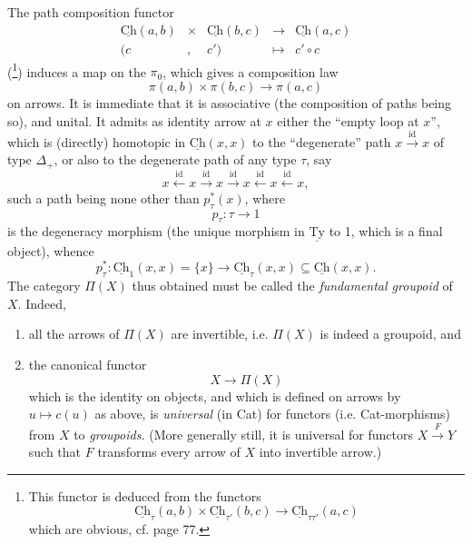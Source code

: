 \documentclass[11pt]{article}
\newcommand{\printedpage}[1]{\marginpar{\footnotesize p.~#1}}
\newcommand{\msp}[1]{\marginpar{\footnotesize [#1]}}
\newcommand{\Ch}{\underline{\mathrm{Ch}}}
\newcommand{\Ty}{\underline{\mathrm{Ty}}}
\begin{document}
\printedpage{41}
The path composition functor
\[
\begin{array}{ccccc}
\Ch(a,b) & \times & \Ch(b,c) & \longrightarrow & \Ch(a,c)\\
(c & , & c') & \longmapsto & c' \circ c
\end{array}
\]
 (\footnote[17]{This functor is deduced from the functors
\[
\Ch_\tau(a,b) \times \Ch_{\tau'}(b,c) \longrightarrow \Ch_{\tau\tau'}(a,c)
\]
which are obvious, cf. page 77.}) induces a map on the $\pi_0$, which gives a composition law
\[
\pi(a,b) \times \pi(b,c) \longrightarrow \pi(a,c)
\]
on arrows. It is immediate that it is associative (the composition of paths being so), and unital. It admits as identity arrow at $x$ either the ``empty loop at $x$'', which is (directly) homotopic in $\Ch(x,x)$ to the ``degenerate'' path $x \xrightarrow{\mathrm{id}} x$
\msp{page 62}
of type $\Delta_+$, or also to the degenerate path of any type $\tau$, say
\[
x \xleftarrow{\mathrm{id}} x \xrightarrow{\mathrm{id}} x \xrightarrow{\mathrm{id}} x \xleftarrow{\mathrm{id}} x \xleftarrow{\mathrm{id}} x,
\]
such a path being none other than $p_\tau^*(x)$, where
\[
p_\tau : \tau \longrightarrow 1
\]
is the degeneracy morphism (the unique morphism in $\Ty$ to 1, which is a final object), whence
\[
p_\tau^* : \Ch_1(x,x) = \{x\} \longrightarrow \Ch_\tau(x,x) \subseteq \Ch(x,x).
\]
The category $\Pi(X)$ thus obtained must be called the \textit{fundamental groupoid} of $X$. Indeed, %

\begin{enumerate}[label=\alph*)]
\item all the arrows of $\Pi(X)$ are invertible, i.e. $\Pi(X)$ is indeed a groupoid, and
\item the canonical functor
\[
X \longrightarrow \Pi(X)
\]
which is the identity on objects, and which is defined on arrows by $u \longmapsto c(u)$ as above, is \textit{universal} (in Cat) for functors (i.e. Cat-morphisms) from $X$ to \textit{groupoids.} (More generally still, it is universal for functors $X \xrightarrow{F} Y$ such that $F$ transforms every arrow of $X$ into invertible arrow.)
\end{enumerate}
\end{document}
